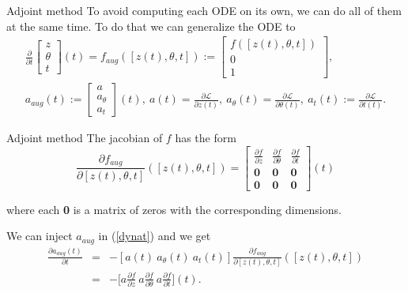 \documentclass[11pt]{beamer}
\begin{document}
\begin{frame}{Adjoint method}
To avoid computing each ODE on its own, we can do all of them at the same time. To do that we can generalize the ODE to
\begin{eqnarray*}
\frac{\partial}{\partial t} \begin{bmatrix}
							z \\ \theta \\ t
							\end{bmatrix} (t) 
= f_{aug}([z(t),\theta ,t]) := \begin{bmatrix}
							f([z(t),\theta ,t]) \\ 0 \\ 1
							\end{bmatrix}, \\
a_{aug} (t) := \begin{bmatrix}
			a \\ a_{\theta} \\ a_t
			\end{bmatrix} (t) , \ 
a(t) = \frac{\partial \mathcal{L}}{\partial z(t)}, \ 
a_\theta (t) = \frac{\partial \mathcal{L}}{\partial \theta (t)}, \ 
a_t(t) := \frac{\partial \mathcal{L}}{\partial t(t)}.
\end{eqnarray*}
\end{frame}

\begin{frame}{Adjoint method}
The jacobian of $f$ has the form
\begin{equation*}
\frac{\partial f_{aug}}{\partial [z(t),\theta,t]}([z(t),\theta,t]) = \begin{bmatrix}
\frac{\partial f}{\partial z} & \frac{\partial f}{\partial \theta} & \frac{\partial f}{\partial t} \\
\textbf{0} & \textbf{0} & \textbf{0} \\
\textbf{0} & \textbf{0} & \textbf{0}
\end{bmatrix}(t)
\end{equation*}

where each \textbf{0} is a matrix of zeros with the corresponding dimensions.

We can inject $a_{aug}$ in (\ref{dynat}) and we get
\begin{eqnarray*}
\frac{\partial a_{aug}(t)}{\partial t} 
&=& - [a(t) \ a_\theta (t) \ a_t (t)]\frac{\partial f_{aug}}{\partial [ z(t),\theta , t]}([z(t),\theta , t]) \\
&=& -\Big[a\frac{\partial f}{\partial z} \ a\frac{\partial f}{\partial \theta} \ a\frac{\partial  f}{\partial t}\Big] (t).
\end{eqnarray*}
\end{frame}
\end{document}
